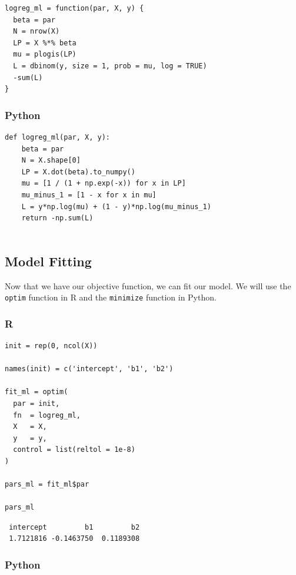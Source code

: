\documentclass[
  letterpaper,
]{krantz}
\begin{document}
\begin{verbatim}
logreg_ml = function(par, X, y) {
  beta = par
  N = nrow(X)
  LP = X %*% beta                           
  mu = plogis(LP)                           
  L = dbinom(y, size = 1, prob = mu, log = TRUE)   
  -sum(L)                                   
}
\end{verbatim}

\subsubsection{Python}

\begin{verbatim}
def logreg_ml(par, X, y):
    beta = par
    N = X.shape[0]
    LP = X.dot(beta).to_numpy()  
    mu = [1 / (1 + np.exp(-x)) for x in LP]
    mu_minus_1 = [1 - x for x in mu]
    L = y*np.log(mu) + (1 - y)*np.log(mu_minus_1)   
    return -np.sum(L)   
  
\end{verbatim}

\subsection{Model Fitting}\label{sec-glm-binomial-fitting}

Now that we have our objective function, we can fit our model. We will
use the \texttt{optim} function in R and the \texttt{minimize} function
in Python.

\subsubsection{R}

\begin{verbatim}
init = rep(0, ncol(X))

names(init) = c('intercept', 'b1', 'b2')

fit_ml = optim(
  par = init,
  fn  = logreg_ml,
  X   = X,
  y   = y,
  control = list(reltol = 1e-8)
)

pars_ml = fit_ml$par

pars_ml
\end{verbatim}

\begin{verbatim}
 intercept         b1         b2 
 1.7121816 -0.1463750  0.1189308 
\end{verbatim}

\subsubsection{Python}
\end{document}

